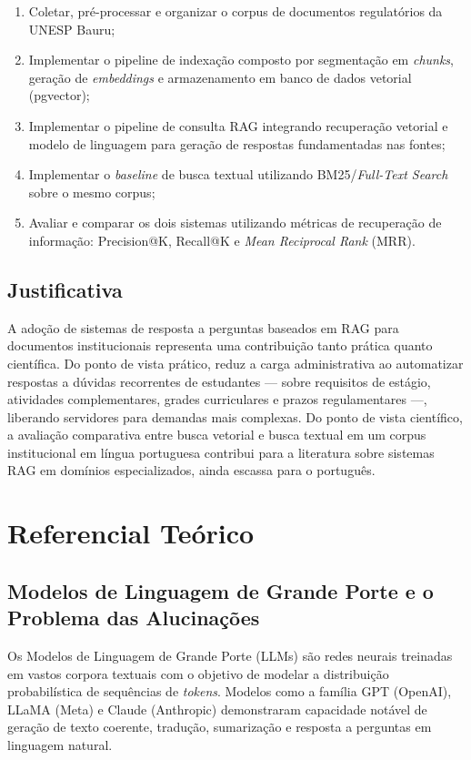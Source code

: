\documentclass[
  12pt,
  openright,
  twoside,
  a4paper,
  brazil
]{abntex2}
\begin{document}
\begin{enumerate}[label=\alph*)]
  \item Coletar, pré-processar e organizar o corpus de documentos regulatórios da UNESP Bauru;
  \item Implementar o pipeline de indexação composto por segmentação em \textit{chunks}, geração de \textit{embeddings} e armazenamento em banco de dados vetorial (pgvector);
  \item Implementar o pipeline de consulta RAG integrando recuperação vetorial e modelo de linguagem para geração de respostas fundamentadas nas fontes;
  \item Implementar o \textit{baseline} de busca textual utilizando BM25/\textit{Full-Text Search} sobre o mesmo corpus;
  \item Avaliar e comparar os dois sistemas utilizando métricas de recuperação de informação: Precision@K, Recall@K e \textit{Mean Reciprocal Rank} (MRR).
\end{enumerate}

\section{Justificativa}

A adoção de sistemas de resposta a perguntas baseados em RAG para documentos institucionais representa uma contribuição tanto prática quanto científica. Do ponto de vista prático, reduz a carga administrativa ao automatizar respostas a dúvidas recorrentes de estudantes --- sobre requisitos de estágio, atividades complementares, grades curriculares e prazos regulamentares ---, liberando servidores para demandas mais complexas. Do ponto de vista científico, a avaliação comparativa entre busca vetorial e busca textual em um corpus institucional em língua portuguesa contribui para a literatura sobre sistemas RAG em domínios especializados, ainda escassa para o português.

\chapter{Referencial Teórico}

\section{Modelos de Linguagem de Grande Porte e o Problema das Alucinações}

Os Modelos de Linguagem de Grande Porte (LLMs) são redes neurais treinadas em vastos corpora textuais com o objetivo de modelar a distribuição probabilística de sequências de \textit{tokens}. Modelos como a família GPT (OpenAI), LLaMA (Meta) e Claude (Anthropic) demonstraram capacidade notável de geração de texto coerente, tradução, sumarização e resposta a perguntas em linguagem natural.
\end{document}
